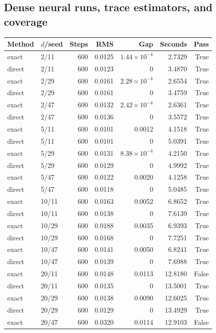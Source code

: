 \subsection{Dense neural runs, trace estimators, and coverage}
\begingroup\footnotesize\setlength{\tabcolsep}{4pt}
\begin{longtable}{llrrrrr}
\toprule Method & $d$/seed & Steps & RMS & Gap & Seconds & Pass\\\midrule\endhead
exact & 2/11 & 600 & 0.0125 & $1.44\times10^{-4}$ & 2.7329 & True\\
direct & 2/11 & 600 & 0.0123 & 0 & 3.4870 & True\\
exact & 2/29 & 600 & 0.0161 & $2.28\times10^{-4}$ & 2.6554 & True\\
direct & 2/29 & 600 & 0.0161 & 0 & 3.4759 & True\\
exact & 2/47 & 600 & 0.0132 & $2.42\times10^{-4}$ & 2.6361 & True\\
direct & 2/47 & 600 & 0.0136 & 0 & 3.5572 & True\\
exact & 5/11 & 600 & 0.0101 & 0.0012 & 4.1518 & True\\
direct & 5/11 & 600 & 0.0101 & 0 & 5.0391 & True\\
exact & 5/29 & 600 & 0.0131 & $8.38\times10^{-4}$ & 4.2150 & True\\
direct & 5/29 & 600 & 0.0129 & 0 & 4.9992 & True\\
exact & 5/47 & 600 & 0.0122 & 0.0020 & 4.1258 & True\\
direct & 5/47 & 600 & 0.0118 & 0 & 5.0485 & True\\
exact & 10/11 & 600 & 0.0163 & 0.0052 & 6.8652 & True\\
direct & 10/11 & 600 & 0.0138 & 0 & 7.6139 & True\\
exact & 10/29 & 600 & 0.0188 & 0.0035 & 6.9393 & True\\
direct & 10/29 & 600 & 0.0168 & 0 & 7.7251 & True\\
exact & 10/47 & 600 & 0.0141 & 0.0050 & 6.8241 & True\\
direct & 10/47 & 600 & 0.0139 & 0 & 7.6988 & True\\
exact & 20/11 & 600 & 0.0148 & 0.0113 & 12.8180 & False\\
direct & 20/11 & 600 & 0.0135 & 0 & 13.5001 & True\\
exact & 20/29 & 600 & 0.0138 & 0.0090 & 12.6025 & True\\
direct & 20/29 & 600 & 0.0129 & 0 & 13.4929 & True\\
exact & 20/47 & 600 & 0.0320 & 0.0114 & 12.9103 & False\\

\end{longtable}
